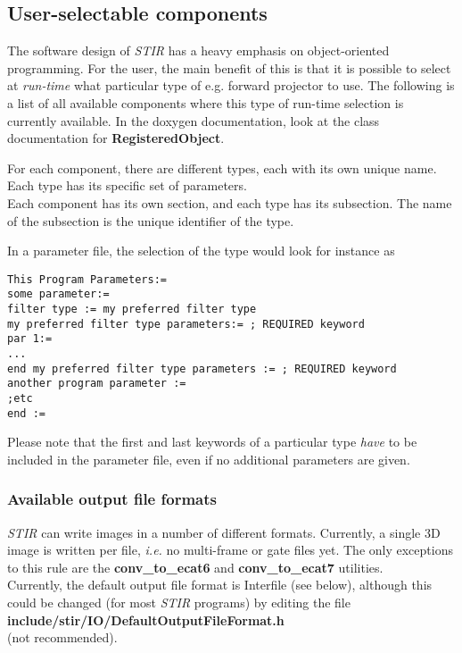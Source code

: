 \documentclass{article}
\begin{document}
\subsection{
User-selectable components}
\label{sec:user-selectablecomponents}
The software design of \textit{STIR} has a heavy emphasis on object-oriented 
programming. For the user, the main benefit of this is that it 
is possible to select at \textit{run-time} what particular type of 
e.g. forward projector to use. The following is a list of all 
available components where this type of run-time selection is 
currently available. In the doxygen documentation, look at the 
class documentation for \textbf{RegisteredObject}.


For each component, there are different types, each with its 
own unique name. Each type has its specific set of parameters. 
\\
Each component has its own section, and each type has its subsection. 
The name of the subsection is the unique identifier of the type.


In a parameter file, the selection of the type would look for 
instance as

\begin{verbatim}
This Program Parameters:=
some parameter:=
filter type := my preferred filter type 
my preferred filter type parameters:= ; REQUIRED keyword 
par 1:= 
... 
end my preferred filter type parameters := ; REQUIRED keyword
another program parameter :=
;etc
end :=
\end{verbatim}


Please note that the first and last keywords of a particular 
type \textit{have} to be included in the parameter file, even if no 
additional parameters are given.


\subsubsection{
Available output file formats}
\label{sec:outputfileformats}

\textit{STIR} can write images in a number of different formats. Currently, 
a single 3D image is written per file, \textit{i.e.} no multi-frame 
or gate files yet. The only exceptions to this rule are the \textbf{conv\_to\_ecat6} 
and \textbf{conv\_to\_ecat7} utilities.\\
Currently, the default output file format is Interfile (see below), 
although this could be changed (for most \textit{STIR} programs) by 
editing the file\\
 \textbf{include/stir/IO/DefaultOutputFileFormat.h}\\ 
(not recommended).
\end{document}
